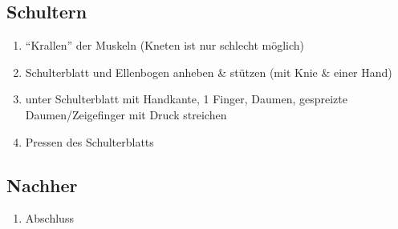 \subsection{Schultern}
\begin{enumerate}
\item "`Krallen"' der Muskeln (Kneten ist nur schlecht möglich)
\item Schulterblatt und Ellenbogen anheben \& stützen (mit Knie \& einer Hand)
\item unter Schulterblatt mit Handkante, 1 Finger, Daumen, gespreizte Dau\-men/Zei\-ge\-fin\-ger mit Druck streichen
\item Pressen des Schulterblatts
\end{enumerate}

\subsection{Nachher}
\begin{enumerate}
\item Abschluss
\end{enumerate}
